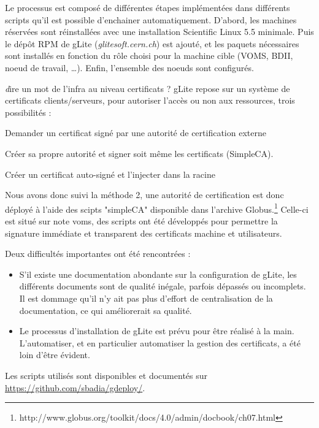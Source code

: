 \documentclass[a4paper,11pt]{article}
\newcommand{\todo}[1]{{\color{red}\textsl #1}}
\begin{document}
Le processus est composé de différentes étapes implémentées dans différents
scripts qu'il est possible d'enchainer automatiquement.  D'abord, les machines
réservées sont réinstallées avec une installation Scientific Linux 5.5
minimale. Puis le dépôt RPM de gLite (\textsl{glitesoft.cern.ch}) est ajouté,
et les paquets nécessaires sont installés en fonction du rôle choisi pour la
machine cible (VOMS, BDII, noeud de travail, \ldots). Enfin, l'ensemble des
noeuds sont configurés.

\todo{dire un mot de l'infra au niveau certificats ?}
gLite repose sur un système de certificats clients/serveurs, pour autoriser l'accès
ou non aux ressources, trois possibilités :
\begin{listing}
\item Demander un certificat signé par une autorité de certification externe
\item Créer sa	propre autorité et signer soit même les certificats (SimpleCA).
\item Créer un certificat auto-signé et l'injecter dans la racine
\end{listing}
Nous avons donc suivi la méthode 2, une autorité de certification est donc déployé à
l'aide des scipts "simpleCA" disponible dans l'archive Globus.\footnote{http://www.globus.org/toolkit/docs/4.0/admin/docbook/ch07.html}
Celle-ci est situé sur note voms, des scripts ont été développés pour permettre la signature
immédiate et transparent des certificats machine et utilisateurs.

Deux difficultés importantes ont été rencontrées :

\begin{itemize}

\item S'il existe une documentation abondante sur la configuration de gLite,
	les différents documents sont de qualité inégale, parfois dépassés ou
	incomplets. Il est dommage qu'il n'y ait pas  plus d'effort de
	centralisation de la documentation, ce qui améliorerait sa qualité.

\item Le processus d'installation de gLite est prévu pour être réalisé à la
	main. L'automatiser, et en particulier automatiser la gestion des
	certificats, a été loin d'être évident.

\end{itemize}

Les scripts utilisés sont disponibles et documentés sur \url{https://github.com/sbadia/gdeploy/}.
\end{document}
